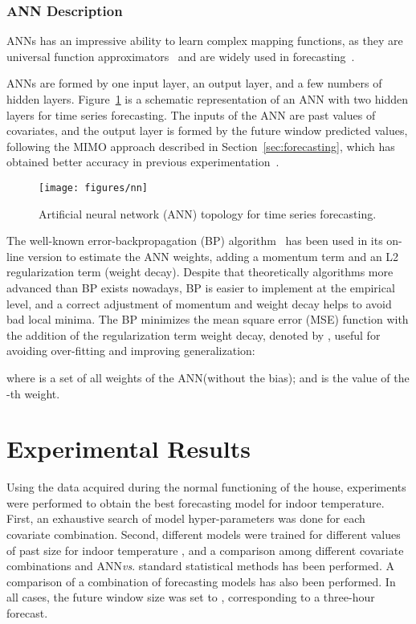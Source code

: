 \documentclass[energies,article,accept,moreauthors,pdftex,12pt,a4paper]{mdpi}
\newcommand{\ann}{ANN\xspace}
\newcommand{\anns}{ANNs\xspace}
\begin{document}
\subsubsection{ANN Description}

\anns has an impressive ability to learn complex mapping functions, as they are universal function approximators~\cite{bishop:95} and are widely used in
forecasting~\cite{Zhang199835,2006:energyandbuildings:ruano,Yu20082623,2011:energyandbuildings:escriva}.

\anns are formed by one input layer, an output layer, and a few numbers of hidden
layers. Figure~\ref{fig:nn} is a schematic representation of an \ann with
two hidden layers for time series forecasting.
The inputs of the \ann are past values of covariates, and the output layer is formed
by the  future window predicted values, following the MIMO approach described
in Section~\ref{sec:forecasting}, which has obtained better accuracy in previous
experimentation~\cite{2012:kdir:zamora}.

\begin{figure}[H]
 \centering
 \texttt{[image: figures/nn]}
 \caption{Artificial neural network (ANN) topology for time series forecasting.\label{fig:nn}}
\end{figure}


The well-known error-backpropagation (BP)
algorithm~\cite{1988:nature:rumelhart} has been used in its on-line version to estimate the \ann weights, adding a momentum term and an L2
regularization term (weight decay).
Despite that theoretically algorithms more advanced than BP exists nowadays, BP is easier to implement at the empirical level, and a correct adjustment of
momentum and weight decay helps to avoid bad local minima.
The BP minimizes the mean
square error (MSE) function with the addition of the regularization term weight
decay, denoted by , useful for avoiding over-fitting and improving
generalization:
\vspace {-3pt}

\vspace {6pt}
\noindent where  is a set of all weights of
the \ann (without the bias); and  is the value of the -th weight.
\vspace {-6pt}

\section{Experimental Results}

Using the data acquired during the normal functioning of the house, experiments were
performed to obtain the best forecasting model for indoor
temperature. First, an exhaustive search of model hyper-parameters was done for each
covariate combination. Second, different models were trained for different
values of past size for indoor temperature , and a comparison among
different covariate combinations and \ann \textit{vs}. standard statistical methods has
been performed. A comparison of a combination of forecasting models has also been performed. In all cases, the future window size  was set to ,
corresponding to a three-hour forecast.
\end{document}
